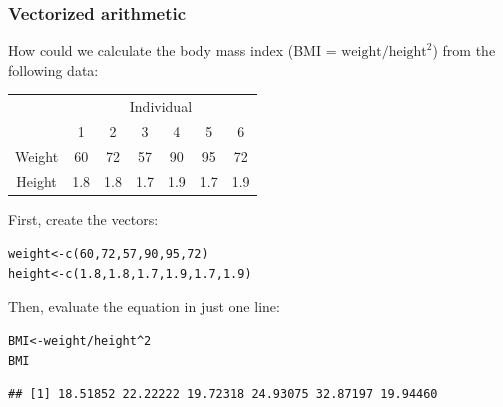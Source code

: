 \documentclass[color=usenames,dvipsnames]{beamer}\usepackage[]{graphicx}\usepackage[]{color}
\makeatletter
\newcommand{\hlnum}[1]{\textcolor[rgb]{0.69,0.494,0}{#1}}%
\newcommand{\hlopt}[1]{\textcolor[rgb]{0,0,0}{#1}}%
\newcommand{\hlstd}[1]{\textcolor[rgb]{0,0,0}{#1}}%
\newcommand{\hlkwb}[1]{\textcolor[rgb]{0,0.341,0.682}{#1}}%
\newcommand{\hlkwd}[1]{\textcolor[rgb]{0.004,0.004,0.506}{#1}}%
\newenvironment{kframe}{%
 \def\at@end@of@kframe{}%
 \ifinner\ifhmode%
  \def\at@end@of@kframe{\end{minipage}}%
  \begin{minipage}{\columnwidth}%
 \fi\fi%
 \def\FrameCommand##1{\hskip\@totalleftmargin \hskip-\fboxsep
 \colorbox{shadecolor}{##1}\hskip-\fboxsep
     \hskip-\linewidth \hskip-\@totalleftmargin \hskip\columnwidth}%
 \MakeFramed {\advance\hsize-\width
   \@totalleftmargin\z@ \linewidth\hsize
   \@setminipage}}%
 {\par\unskip\endMakeFramed%
 \at@end@of@kframe}
\newenvironment{knitrout}{}{} %
\makeatother
\begin{document}
\begin{frame}[fragile]
  \frametitle{Vectorized arithmetic}
  How could we calculate the body mass index (BMI = $\text{weight}/\text{height}^2$) from the following data:
  \begin{center}
    \begin{tabular}{ccccccc}
      \hline
      & \multicolumn{6}{c}{Individual} \\
      \cline{2-7}
      & 1 & 2 & 3 & 4 & 5 & 6 \\
      \hline
      Weight & 60 & 72 & 57 & 90 & 95 & 72 \\
      Height & 1.8 & 1.8 & 1.7 & 1.9 & 1.7 & 1.9 \\
      \hline
    \end{tabular}
  \end{center}
  \pause
  First, create the vectors:
\begin{knitrout}
\color{fgcolor}\begin{kframe}
\begin{alltt}
\hlstd{weight} \hlkwb{<-} \hlkwd{c}\hlstd{(}\hlnum{60}\hlstd{,} \hlnum{72}\hlstd{,} \hlnum{57}\hlstd{,} \hlnum{90}\hlstd{,} \hlnum{95}\hlstd{,} \hlnum{72}\hlstd{)}
\hlstd{height} \hlkwb{<-} \hlkwd{c}\hlstd{(}\hlnum{1.8}\hlstd{,} \hlnum{1.8}\hlstd{,} \hlnum{1.7}\hlstd{,} \hlnum{1.9}\hlstd{,} \hlnum{1.7}\hlstd{,} \hlnum{1.9}\hlstd{)}
\end{alltt}
\end{kframe}
\end{knitrout}
  \pause
  Then, evaluate the equation in just one line:
\begin{knitrout}\footnotesize
{}\color{fgcolor}\begin{kframe}
\begin{alltt}
\hlstd{BMI} \hlkwb{<-} \hlstd{weight}\hlopt{/}\hlstd{height}\hlopt{^}\hlnum{2}
\hlstd{BMI}
\end{alltt}
\begin{verbatim}
## [1] 18.51852 22.22222 19.72318 24.93075 32.87197 19.94460
\end{verbatim}
\end{kframe}
\end{knitrout}
\end{frame}
\end{document}
